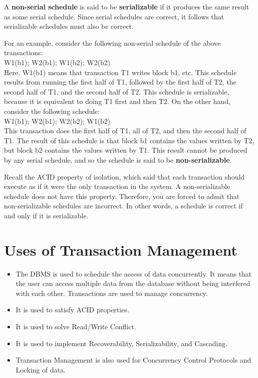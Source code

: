 \documentclass{article}
\begin{document}
A \textbf{non-serial schedule} is said to be \textbf{serializable} if it produces the same result as some serial schedule. Since serial schedules are correct, it follows that serializable schedules must also be correct.

For an example, consider the following non-serial schedule of the above transactions:\\

W1(b1); W2(b1); W1(b2); W2(b2)\\

Here, W1(b1) means that transaction T1 writes block b1, etc. This schedule
results from running the first half of T1, followed by the first half of T2, the second half of T1, and the second half of T2. This schedule is serializable, because it is equivalent to doing T1 first and then T2. On the other hand, consider the following schedule:\\

W1(b1); W2(b1); W2(b2); W1(b2)\\

This transaction does the first half of T1, all of T2, and then the second half of T1. The result of this schedule is that block b1 contains the values written by T2, but block b2 contains the values written by T1. This result cannot be produced by any serial schedule, and so the schedule is said to be \textbf{non-serializable}.

Recall the ACID property of isolation, which said that each transaction should execute as if it were the only transaction in the system. A non-serializable schedule does not have this property. Therefore, you are forced to admit that non-serializable schedules are incorrect. In other words, a schedule is correct if and only if it is serializable.


\section*{Uses of Transaction Management} 

\begin{itemize}
\item The DBMS is used to schedule the access of data concurrently. It means that the user can access multiple data from the database without being interfered with each other. Transactions are used to manage concurrency.
\item It is used to satisfy ACID properties.
\item It is used to solve Read/Write Conflict.
\item It is used to implement Recoverability, Serializability, and Cascading.
\item Transaction Management is also used for Concurrency Control Protocols and Locking of data.
\end{itemize}
\end{document}
